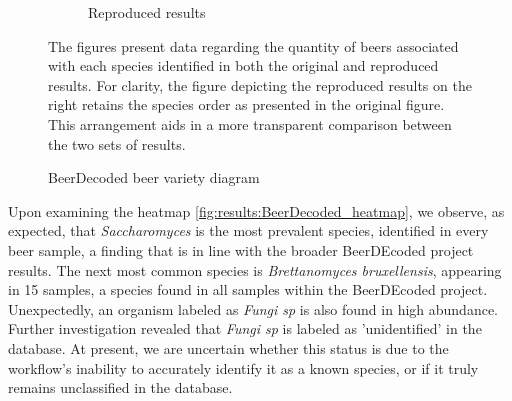 \begin{figure}[H]
\begin{subfigure}[b]{0.45\textwidth}
        \caption{Reproduced results}
        \label{fig:results:reproduced_BeerDecoded_beer_variety}
    \end{subfigure}
    \caption{BeerDecoded beer variety diagram}
    \small The figures present data regarding the quantity of beers associated with each species identified in both the original and reproduced results. For clarity, the figure depicting the reproduced results on the right retains the species order as presented in the original figure. This arrangement aids in a more transparent comparison between the two sets of results.
    \label{fig:results:BeerDecoded_beer_variety}
\end{figure}


    Upon examining the heatmap \ref{fig:results:BeerDecoded_heatmap}, we observe, as expected, that \textit{Saccharomyces} is the most prevalent species, identified in every beer sample, a finding that is in line with the broader BeerDEcoded project results. The next most common species is \textit{Brettanomyces bruxellensis}, appearing in 15 samples, a species found in all samples within the BeerDEcoded project. Unexpectedly, an organism labeled as \textit{Fungi sp} is also found in high abundance. Further investigation revealed that \textit{Fungi sp} is labeled as 'unidentified' in the database. At present, we are uncertain whether this status is due to the workflow's inability to accurately identify it as a known species, or if it truly remains unclassified in the database.

